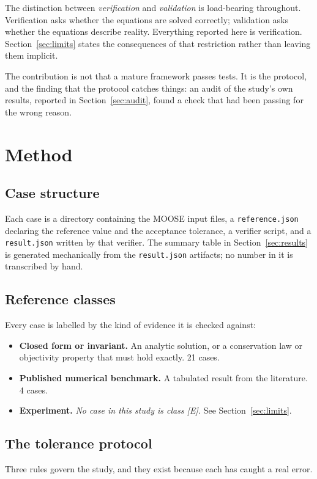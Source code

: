\documentclass[11pt,a4paper]{article}
\begin{document}
The distinction between \emph{verification} and \emph{validation} is load-bearing
throughout. Verification asks whether the equations are solved correctly;
validation asks whether the equations describe reality. Everything reported here
is verification. Section~\ref{sec:limits} states the consequences of that
restriction rather than leaving them implicit.

The contribution is not that a mature framework passes tests. It is the
protocol, and the finding that the protocol catches things: an audit of the
study's own results, reported in Section~\ref{sec:audit}, found a check that had
been passing for the wrong reason.

\section{Method}

\subsection{Case structure}
Each case is a directory containing the MOOSE input files, a
\texttt{reference.json} declaring the reference value and the acceptance
tolerance, a verifier script, and a \texttt{result.json} written by that
verifier. The summary table in Section~\ref{sec:results} is generated
mechanically from the \texttt{result.json} artifacts; no number in it is
transcribed by hand.

\subsection{Reference classes}
Every case is labelled by the kind of evidence it is checked against:

\begin{itemize}
\item[\textbf{[A]}] \textbf{Closed form or invariant.} An analytic solution, or a
  conservation law or objectivity property that must hold exactly. 21 cases.
\item[\textbf{[B]}] \textbf{Published numerical benchmark.} A tabulated result
  from the literature. 4 cases.
\item[\textbf{[E]}] \textbf{Experiment.} \emph{No case in this study is class
  [E].} See Section~\ref{sec:limits}.
\end{itemize}

\subsection{The tolerance protocol}
Three rules govern the study, and they exist because each has caught a real
error.
\end{document}
